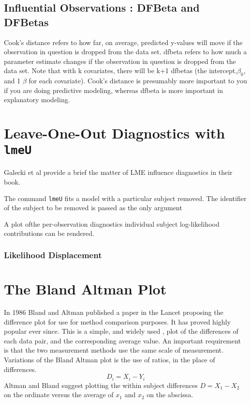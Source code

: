 \documentclass[12pt, a4paper]{report}
\begin{document}
\subsection{Influential Observations : DFBeta and DFBetas}
Cook's distance refers to how far, on average, predicted y-values will move if the observation in question is dropped from the data set. dfbeta refers to how much a parameter estimate changes if the observation in question is dropped from the data set. Note that with k covariates, there will be k+1 dfbetas (the intercept,$\beta_0$, and 1 $\beta$ for each covariate). Cook's distance is presumably more important to you if you are doing predictive modeling, whereas dfbeta is more important in explanatory modeling.




\section*{Leave-One-Out Diagnostics with \texttt{lmeU}}
Galecki et al provide a brief the matter of LME influence diagnostics in their book.

The command \texttt{lmeU} fits a model with a particular subject removed. The identifier of the subject to be removed is passed as the only argument

A plot ofthe per-observation diagnostics individual subject log-likelihood contributions can be rendered.

\subsubsection*{Likelihood Displacement}


\section{The Bland Altman Plot}
In 1986 Bland and Altman published a paper in the Lancet proposing
the difference plot for use for method comparison purposes. It has
proved highly popular ever since. This is a simple, and widely
used , plot of the differences of each data pair, and the
corresponding average value. An important requirement is that the
two measurement methods use the same scale of measurement.
\\
Variations of the Bland Altman plot is the use of ratios, in the
place of differences.
\begin{equation}
D_{i} = X_{i} - Y_{i}   \label{BA01}
\end{equation}
Altman and Bland suggest plotting the within subject differences $
D = X_{1} - X_{2} $ on the ordinate versus the average of $x_{1}$
and  $x_{2}$ on the abscissa.
\end{document}
